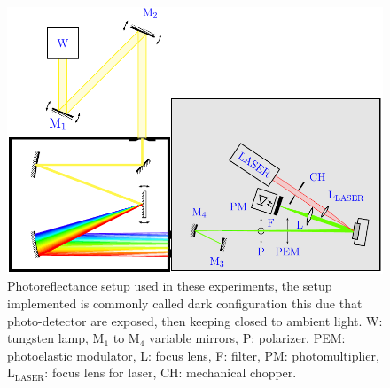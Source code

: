 \begin{figure}[ht!]
	\centering
	\includegraphics[width=\textwidth]{../figures/chapter-3/pr-setup/build/pr-setup.pdf}
	\caption[PR Scheme]{Photoreflectance setup used in these experiments, the setup implemented is commonly called dark configuration this due that photo-detector are exposed, then keeping closed to ambient light.  W: tungsten lamp, $\mathrm{M_1}$ to $\mathrm{M_4}$ variable mirrors, P: polarizer, PEM: photoelastic modulator, L: focus lens, F: filter, PM: photomultiplier, $\mathrm{L_{LASER}}$: focus lens for laser, CH: mechanical chopper.}
	\label{fig:chapter-3-PR-SETUP}
\end{figure}

